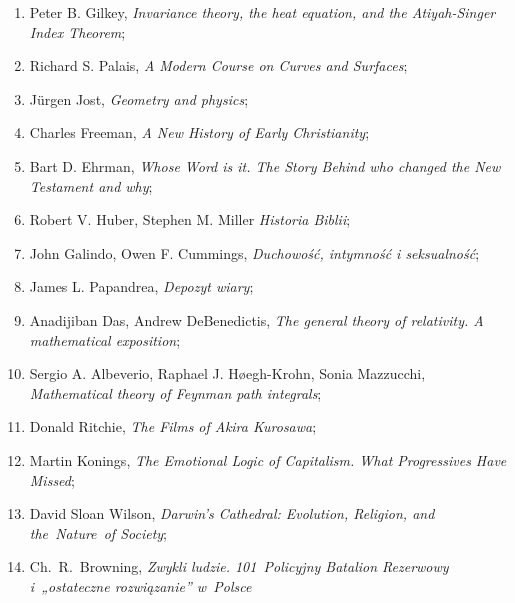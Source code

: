 \documentclass[a4paper,11pt]{article}
\begin{document}
\begin{enumerate}
\item Peter B. Gilkey, \textit{Invariance theory, the heat equation, and
    the Atiyah-Singer Index Theorem};

\item Richard S. Palais, \textit{A Modern Course on Curves and
    Surfaces};

\item J\"{u}rgen Jost, \textit{Geometry and physics};

\item Charles Freeman, \textit{A New History of Early Christianity};

\item Bart D. Ehrman, \textit{Whose Word is it. The Story Behind who
    changed the New Testament and why};

\item Robert V. Huber, Stephen M. Miller \textit{Historia Biblii};

\item John Galindo, Owen F. Cummings, \textit{Duchowość, intymność i
    seksualność};

\item James L. Papandrea, \textit{Depozyt wiary};

\item Anadijiban Das, Andrew DeBenedictis, \textit{The general theory of relativity. A mathematical exposition};

\item Sergio A. Albeverio, Raphael J. H\o egh-Krohn, Sonia Mazzucchi, \textit{Mathematical theory of Feynman path integrals};




\item Donald Ritchie, \textit{The Films of Akira Kurosawa};

\item Martin Konings, \textit{The Emotional Logic of Capitalism. What
    Progressives Have Missed};

\item David Sloan Wilson, \textit{Darwin's Cathedral: Evolution,
    Religion, and the~Nature~of Society};

\item Ch.~R.~Browning, \textit{Zwykli ludzie. 101~Policyjny Batalion
    Rezerwowy i~„ostateczne rozwiązanie” w~Polsce}


\end{enumerate}
\end{document}
